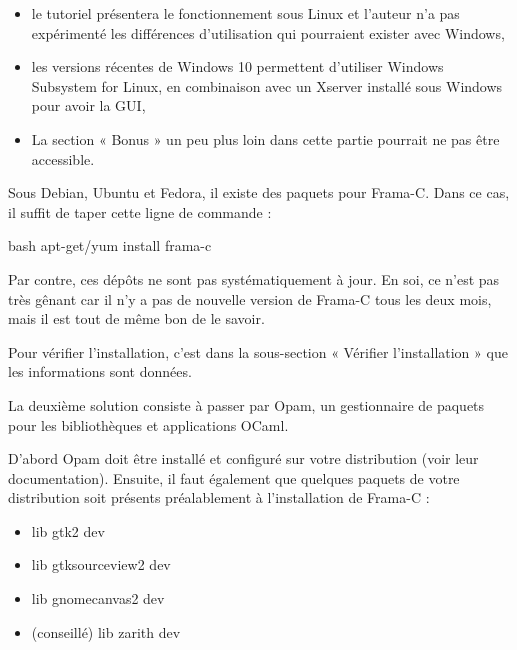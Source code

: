 \begin{Warning}
\begin{itemize}
\item le tutoriel présentera le fonctionnement sous Linux et l'auteur n'a pas 
expérimenté les différences d'utilisation qui pourraient exister avec 
Windows,
\item les versions récentes de Windows 10 permettent d'utiliser Windows Subsystem
  for Linux, en combinaison avec un Xserver installé sous Windows pour avoir la
  GUI,
\item La section « Bonus » un peu plus loin dans cette partie pourrait ne pas être
accessible.
\end{itemize}
\end{Warning}






Sous Debian, Ubuntu et Fedora, il existe des paquets pour Frama-C. Dans ce cas, 
il suffit de taper cette ligne de commande :



\begin{CodeBlock}{bash}
apt-get/yum install frama-c
\end{CodeBlock}



Par contre, ces dépôts ne sont pas systématiquement à jour. En soi, ce n'est pas très gênant car il n'y a pas de nouvelle version de Frama-C tous les deux mois, mais il est tout de même bon de le savoir.



Pour vérifier l'installation, c'est dans la sous-section « Vérifier l'installation »
que les informations sont données.





La deuxième solution consiste à passer par Opam, un gestionnaire de paquets 
pour les bibliothèques et applications OCaml.



D'abord Opam doit être installé et configuré sur votre distribution (voir 
leur documentation). Ensuite, il faut également que quelques paquets de votre
distribution soit présents préalablement à l'installation de Frama-C :



\begin{itemize}
\item lib gtk2 dev
\item lib gtksourceview2 dev
\item lib gnomecanvas2 dev
\item (conseillé) lib zarith dev
\end{itemize}


